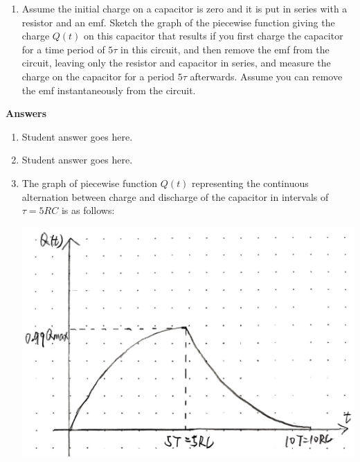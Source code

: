 \documentclass{article}
\begin{document}
\begin{enumerate}
\begin{enumerate}
    \item Assume the initial charge on a capacitor is zero and it is put in series with a resistor and an emf. Sketch the graph of the piecewise function giving the charge $Q(t)$ on this capacitor that results if you first charge the capacitor for a time period of $5\tau$ in this circuit, and then remove the emf from the circuit, leaving only the resistor and capacitor in series, and measure the charge on the capacitor for a period $5\tau$ afterwards. Assume you can remove the emf instantaneously from the circuit. 

  

\end{enumerate}

\color{blue}
\textbf{Answers}
\begin{enumerate}
    \item Student answer goes here.
    \item Student answer goes here.
    \item The graph of piecewise function $Q(t)$ representing the continuous alternation between charge and discharge of the capacitor in intervals of $\tau = 5RC$ is as follows:
    
    \includegraphics[scale=0.2]{./Images/graph3}
\end{enumerate}
\color{black}

\end{enumerate}





\hrulefill
\end{document}
